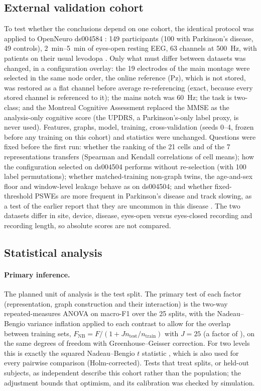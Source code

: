 \subsection{External validation cohort}\label{sec:external}
To test whether the conclusions depend on one cohort, the identical protocol was applied to OpenNeuro
ds004584 \cite{ds004584}: 149 participants (100 with Parkinson's disease, 49 controls), \SIrange{2}{5}{\minute}
of eyes-open resting EEG, 63 channels at \SI{500}{\hertz}, with patients on their usual levodopa
\cite{ds004584src}. Only what must differ between datasets was
changed, in a configuration overlay: the 19 electrodes of the main montage were selected in the same
node order, the online reference (Pz), which is not stored, was restored as a flat channel before
average re-referencing (exact, because every stored channel is referenced to it); the mains notch was
\SI{60}{\hertz}; the task is two-class; and the Montreal Cognitive Assessment replaced the MMSE as the
analysis-only cognitive score (the UPDRS, a Parkinson's-only label proxy, is never used). Features,
graphs, model, training, cross-validation (seeds 0--4, frozen before any training on this cohort) and
statistics were unchanged. Questions were fixed before the first run: whether the ranking of the 21
cells and of the 7 representations transfers (Spearman and Kendall correlations of cell means); how the
configuration selected on ds004504 performs without re-selection (with 100 label permutations);
whether matched-training non-graph twins, the age-and-sex floor and window-level leakage behave as on
ds004504; and whether fixed-threshold PSWEs are more frequent in Parkinson's disease and track
slowing, as a test of the earlier report that they are uncommon in this disease \cite{B3}. The two
datasets differ in site, device, disease, eyes-open versus eyes-closed recording and recording length,
so absolute scores are not compared.

\subsection{Statistical analysis}\label{sec:stats}
\paragraph{Primary inference.} The planned unit of analysis is the test split. The primary test of each
factor (representation, graph construction and their interaction) is the two-way repeated-measures ANOVA
on macro-F1 over the 25 splits, with the Nadeau--Bengio variance inflation applied to each contrast to
allow for the overlap between training sets,
$F_{\mathrm{NB}} = F/(1 + J n_\mathrm{test}/n_\mathrm{train})$ with $J=25$ (a factor of \nbInflation{}), on the
same degrees of freedom with Greenhouse--Geisser correction. For two levels this is exactly the squared
Nadeau--Bengio $t$ statistic \cite{B7}, which is also used for every pairwise comparison (Holm-corrected).
Tests that treat splits, or held-out subjects, as independent describe this cohort rather than the
population; the adjustment bounds that optimism, and its calibration was checked by simulation.

